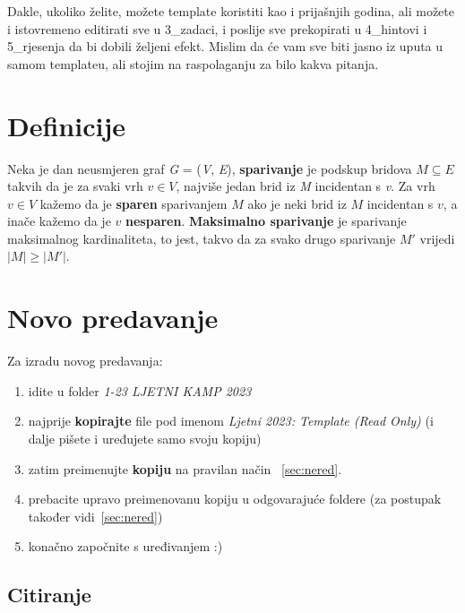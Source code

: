     Dakle, ukoliko želite, možete template koristiti kao i prijašnjih godina, ali možete i istovremeno editirati sve u 3\_zadaci, i poslije sve prekopirati u 4\_hintovi i 5\_rjesenja da bi dobili željeni efekt. Mislim da će vam sve biti jasno iz uputa u samom templateu, ali stojim na raspolaganju za bilo kakva pitanja.
    
    \section{Definicije}
    
	Neka je dan neusmjeren graf \textit{G} = (\textit{V}, \textit{E}), \textbf{sparivanje} je podskup bridova $M \subseteq E$ takvih da je za svaki vrh $v \in V$, najviše jedan brid iz \textit{M} incidentan s \textit{v}. Za vrh $v \in V$ kažemo da je \textbf{sparen} sparivanjem $M$ ako je neki brid iz $M$ incidentan s $v$, a inače kažemo da je $v$ \textbf{nesparen}. \textbf{Maksimalno sparivanje} je sparivanje maksimalnog kardinaliteta, to jest, takvo da za svako drugo sparivanje $M'$ vrijedi $|M| \geq |M'|$.
    
    \newpage
    \section{Novo predavanje}
    
    Za izradu novog predavanja:
    \begin{enumerate}
        \item idite u folder \emph{1-23 LJETNI KAMP 2023}
        \item najprije \textbf{kopirajte} file pod imenom \emph{Ljetni 2023: Template (Read Only)} (i dalje pišete i uređujete samo svoju kopiju)
        \item zatim preimenujte \textbf{kopiju} na pravilan način ~\ref{sec:nered}.
        \item prebacite upravo preimenovanu kopiju u odgovarajuće foldere (za postupak također vidi~\ref{sec:nered})
        \item konačno započnite s uređivanjem :)
    \end{enumerate}
    
    \subsection{Citiranje}
    
